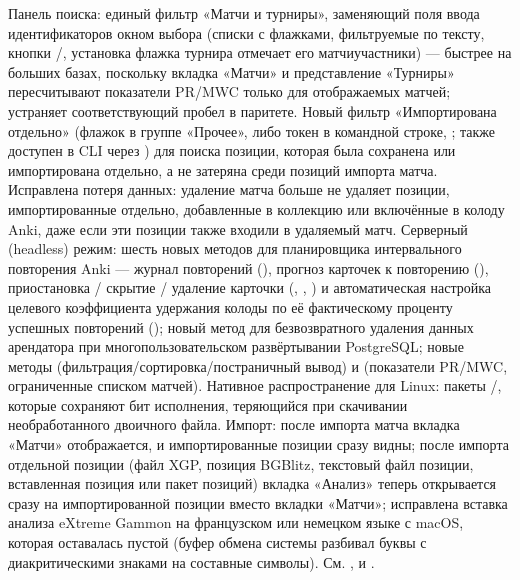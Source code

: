 \documentclass[letterpaper,10pt,russian]{sphinxmanual}
\begin{document}
\begin{savenotes}
\begin{longtable}{}
\begin{varwidth}[t]{}
Панель поиска: единый фильтр «Матчи и турниры», заменяющий поля ввода идентификаторов окном выбора (списки с флажками, фильтруемые по тексту, кнопки /, установка флажка турнира отмечает его матчи\sphinxhyphen{}участники) — быстрее на больших базах, поскольку вкладка «Матчи» и представление «Турниры» пересчитывают показатели PR/MWC только для отображаемых матчей;  устраняет соответствующий пробел в паритете. Новый фильтр «Импортирована отдельно» (флажок в группе «Прочее», либо токен  в командной строке, ; также доступен в CLI через ) для поиска позиции, которая была сохранена или импортирована отдельно, а не затеряна среди позиций импорта матча. Исправлена потеря данных: удаление матча больше не удаляет позиции, импортированные отдельно, добавленные в коллекцию или включённые в колоду Anki, даже если эти позиции также входили в удаляемый матч. Серверный (headless) режим: шесть новых методов для планировщика интервального повторения Anki — журнал повторений (), прогноз карточек к повторению (), приостановка / скрытие / удаление карточки (, , ) и автоматическая настройка целевого коэффициента удержания колоды по её фактическому проценту успешных повторений (); новый метод  для безвозвратного удаления данных арендатора при многопользовательском развёртывании PostgreSQL; новые методы  (фильтрация/сортировка/постраничный вывод) и  (показатели PR/MWC, ограниченные списком матчей). Нативное распространение для Linux: пакеты /, которые сохраняют бит исполнения, теряющийся при скачивании необработанного двоичного файла. Импорт: после импорта матча вкладка «Матчи» отображается, и импортированные позиции сразу видны; после импорта отдельной позиции (файл XGP, позиция BGBlitz, текстовый файл позиции, вставленная позиция или пакет позиций) вкладка «Анализ» теперь открывается сразу на импортированной позиции вместо вкладки «Матчи»; исправлена вставка анализа eXtreme Gammon на французском или немецком языке с macOS, которая оставалась пустой (буфер обмена системы разбивал буквы с диакритическими знаками на составные символы). См. {\hyperref[\detokenize{mode_headless:headless}]{}}, {\hyperref[\detokenize{cmd_mode:cmd-mode}]{}} и {\hyperref[\detokenize{telecharge_install:telecharge-install}]{}}.

\end{varwidth}
\end{longtable}
\end{savenotes}
\end{document}
